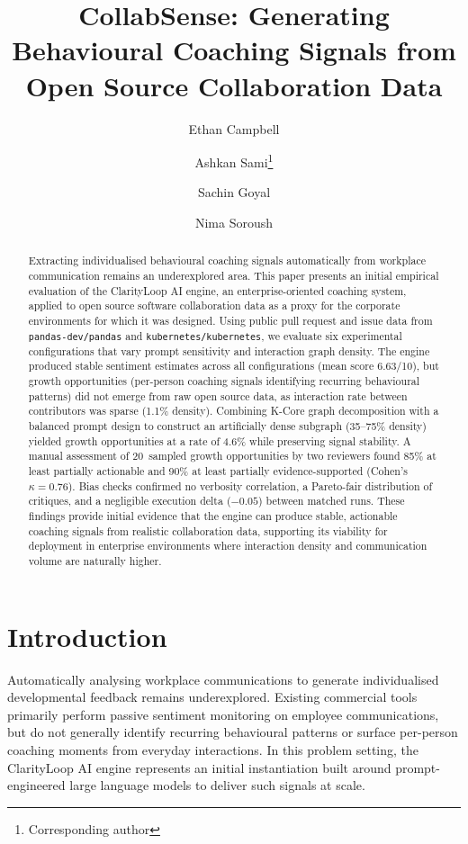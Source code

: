 \documentclass[a4paper,UKenglish,cleveref,autoref]{lipics-v2021}
\title{CollabSense: Generating Behavioural Coaching Signals from Open Source Collaboration Data}
\author{Ethan Campbell}{Edinburgh Napier University, Edinburgh, UK}{e.campbell2@napier.ac.uk}{}{}
\author{Ashkan Sami\footnote{Corresponding author}}{Edinburgh Napier University, Edinburgh, UK}{a.sami@napier.ac.uk}{}{}
\author{Sachin Goyal}{ClarityLoop}{sachin@clarityloop.com}{}{}
\author{Nima Soroush}{ClarityLoop}{nima@clarityloop.com}{}{}
\begin{document}
\maketitle
\begin{abstract}
Extracting individualised behavioural coaching signals automatically from workplace communication remains an underexplored area. This paper presents an initial empirical evaluation of the ClarityLoop AI engine, an enterprise-oriented coaching system, applied to open source software collaboration data as a proxy for the corporate environments for which it was designed. Using public pull request and issue data from \texttt{pandas-dev/pandas} and \texttt{kubernetes/kubernetes}, we evaluate six experimental configurations that vary prompt sensitivity and interaction graph density. The engine produced stable sentiment estimates across all configurations (mean score 6.63/10), but growth opportunities (per-person coaching signals identifying recurring behavioural patterns) did not emerge from raw open source data, as interaction rate between contributors was sparse (1.1\% density). Combining K-Core graph decomposition with a balanced prompt design to construct an artificially dense subgraph (35--75\% density) yielded growth opportunities at a rate of 4.6\% while preserving signal stability. A manual assessment of 20~sampled growth opportunities by two reviewers found 85\% at least partially actionable and 90\% at least partially evidence-supported (Cohen's $\kappa = 0.76$). Bias checks confirmed no verbosity correlation, a Pareto-fair distribution of critiques, and a negligible execution delta ($-0.05$) between matched runs. These findings provide initial evidence that the engine can produce stable, actionable coaching signals from realistic collaboration data, supporting its viability for deployment in enterprise environments where interaction density and communication volume are naturally higher.
\end{abstract}

\section{Introduction}
Automatically analysing workplace communications to generate individualised developmental feedback remains underexplored. Existing commercial tools primarily perform passive sentiment monitoring on employee communications, but do not generally identify recurring behavioural patterns or surface per-person coaching moments from everyday interactions. In this problem setting, the ClarityLoop AI engine represents an initial instantiation built around prompt-engineered large language models to deliver such signals at scale.
\end{document}
